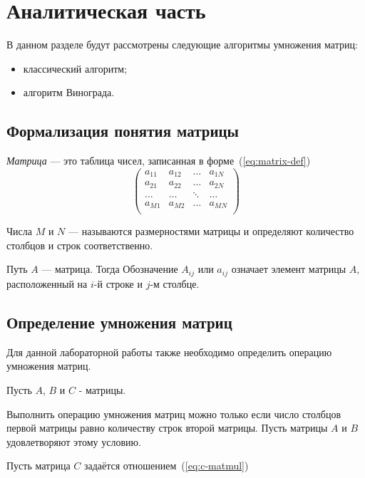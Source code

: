 \chapter{Аналитическая часть}

В данном разделе будут рассмотрены следующие алгоритмы умножения матриц:
\begin{itemize}
    \item классический алгоритм;
    \item алгоритм Винограда.
\end{itemize}

\section{Формализация понятия матрицы}

\emph{Матрица} --- это таблица чисел, записанная в форме~(\ref{eq:matrix-def})~\cite{matrix-citation}
\begin{equation}
    \label{eq:matrix-def}
    \begin{pmatrix}
        a_{11} & a_{12} & \dots & a_{1N} \\
        a_{21} & a_{22} & \dots & a_{2N} \\
        \dots & \dots & \ddots & \dots \\
        a_{M1} & a_{M2} & \dots & a_{MN} \\
    \end{pmatrix}
\end{equation}

Числа $M$ и $N$ --- называются размерностями матрицы и определяют количество столбцов и строк соответственно.

Путь $A$ --- матрица. Тогда Обозначение $A_{ij}$ или $a_{ij}$ означает элемент матрицы $A$, расположенный на $i$-й строке и $j$-м столбце.

\section{Определение умножения матриц}

Для данной лабораторной работы также необходимо определить операцию умножения матриц.

Пусть $A$, $B$ и $C$ - матрицы.

Выполнить операцию умножения матриц можно только если число столбцов первой матрицы равно количеству строк второй матрицы. Пусть матрицы $A$ и $B$ удовлетворяют этому условию.

Пусть матрица $C$ задаётся отношением~(\ref{eq:c-matmul})


